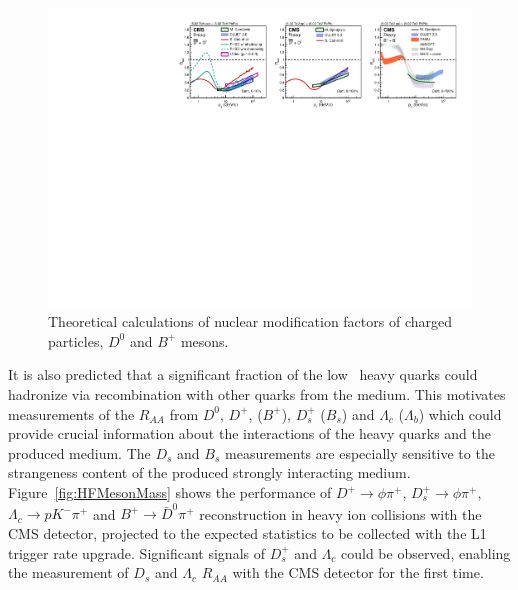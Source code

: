\begin{figure}[!ht]
\begin{center}
\includegraphics[width=.98\textwidth]{figures/cTheoryRAA_BD_v1.pdf}
\caption{Theoretical calculations of nuclear modification factors of charged particles, $D^0$ and $B^+$ mesons.}
\label{fig:RAA_theory}
\end{center}
\end{figure}

It is also predicted that a significant fraction of the low \pt\ heavy quarks could hadronize via recombination with other quarks from the medium. This motivates measurements of the $R_{AA}$ from $D^0$, $D^+$, ($B^+$), $D_s^+$ ($B_s$) and $\Lambda_c$ ($\Lambda_b$) which could provide crucial information about the interactions of the heavy quarks and the produced medium. The $D_s$ and $B_s$ measurements are especially sensitive to the strangeness content of the produced strongly interacting medium. Figure~\ref{fig:HFMesonMass} shows the performance of $D^+\rightarrow \phi\pi^+$, $D_s^+\rightarrow \phi \pi^+$, $\Lambda_c\rightarrow p K^-\pi^+$ and $B^+\rightarrow \bar{D}^0 \pi^+$ reconstruction in heavy ion collisions with the CMS detector, projected to the expected statistics to be collected with the L1 trigger rate upgrade. Significant signals of $D_s^+$ and $\Lambda_c$ could be observed, enabling the measurement of $D_s$ and $\Lambda_c$ $R_{AA}$ with the CMS detector for the first time. 


